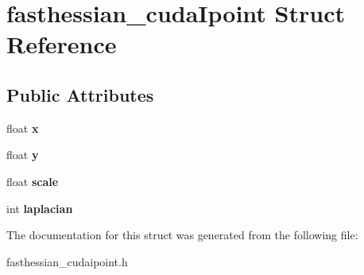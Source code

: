 \hypertarget{structfasthessian__cudaIpoint}{\section{fasthessian\-\_\-cuda\-Ipoint Struct Reference}
\label{structfasthessian__cudaIpoint}
}
\subsection*{Public Attributes}
\begin{DoxyCompactItemize}
\item 
\hypertarget{structfasthessian__cudaIpoint_a911e8fd878cf3729d29475d9341733ae}{float {\bfseries x}}\label{structfasthessian__cudaIpoint_a911e8fd878cf3729d29475d9341733ae}

\item 
\hypertarget{structfasthessian__cudaIpoint_af1f24f592c6b0a0a6861e23d12802054}{float {\bfseries y}}\label{structfasthessian__cudaIpoint_af1f24f592c6b0a0a6861e23d12802054}

\item 
\hypertarget{structfasthessian__cudaIpoint_a4114d95c196d4bae15e0e5a96e36bd25}{float {\bfseries scale}}\label{structfasthessian__cudaIpoint_a4114d95c196d4bae15e0e5a96e36bd25}

\item 
\hypertarget{structfasthessian__cudaIpoint_a9714fe3cc010917b0aa23a69fcbc2d40}{int {\bfseries laplacian}}\label{structfasthessian__cudaIpoint_a9714fe3cc010917b0aa23a69fcbc2d40}

\end{DoxyCompactItemize}


The documentation for this struct was generated from the following file\-:\begin{DoxyCompactItemize}
\item 
fasthessian\-\_\-cudaipoint.\-h\end{DoxyCompactItemize}
